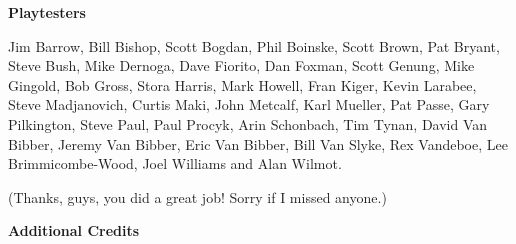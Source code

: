 \begin{center}
\textbf{\Large {} Playtesters}
\end{center}

{
\sloppy
Jim Barrow, Bill Bishop, Scott Bogdan, Phil Boinske, Scott Brown, Pat Bryant, Steve Bush, Mike Dernoga, Dave Fiorito, Dan Foxman, Scott Genung, Mike Gingold, Bob Gross, Stora Harris, Mark Howell, Fran Kiger, Kevin Larabee, Steve Madjanovich, Curtis Maki, John Metcalf, Karl Mueller, Pat Passe, Gary Pilkington, Steve Paul, Paul Procyk, Arin Schonbach, Tim Tynan, David Van Bibber, Jeremy Van Bibber, Eric Van Bibber, Bill Van Slyke, Rex Vandeboe, Lee Brimmicombe-Wood, Joel Williams and Alan Wilmot.
\par
}

(Thanks, guys, you did a great job! Sorry if I missed anyone.)

\newpage

\begin{center}
\textbf{\Large Additional Credits}
\end{center}


